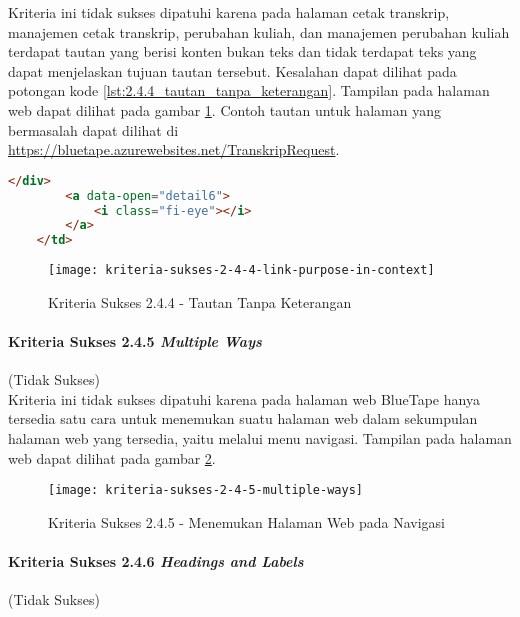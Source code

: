 Kriteria ini tidak sukses dipatuhi karena pada halaman cetak transkrip, manajemen cetak transkrip, perubahan kuliah, dan manajemen perubahan kuliah terdapat tautan yang berisi konten bukan teks dan tidak terdapat teks yang dapat menjelaskan tujuan tautan tersebut. Kesalahan dapat dilihat pada potongan kode \ref{lst:2.4.4_tautan_tanpa_keterangan}. Tampilan pada halaman web dapat dilihat pada gambar \ref{fig:2.4.4_link_purpose_in_context}. Contoh tautan untuk halaman yang bermasalah dapat dilihat di \url{https://bluetape.azurewebsites.net/TranskripRequest}.

\begin{lstlisting}[frame=single, label={lst:2.4.4_tautan_tanpa_keterangan}, language=HTML, caption=Kriteria Sukses 2.4.4 - Tautan Tanpa Keterangan]
        </div>
        <a data-open="detail6">
            <i class="fi-eye"></i>
        </a>
    </td>
\end{lstlisting}

\begin{figure}[H]
    \centering  
    \texttt{[image: kriteria-sukses-2-4-4-link-purpose-in-context]}  
    \caption[Kriteria Sukses 2.4.4 - Tautan Tanpa Keterangan]{Kriteria Sukses 2.4.4 - Tautan Tanpa Keterangan}
    \label{fig:2.4.4_link_purpose_in_context}  
\end{figure} 

\paragraph{Kriteria Sukses 2.4.5 \textit{Multiple Ways}}
\label{par:kepatuhan_bluetape_kriteria_sukses_2.4.5}
(Tidak Sukses)\\

Kriteria ini tidak sukses dipatuhi karena pada halaman web BlueTape hanya tersedia satu cara untuk menemukan suatu halaman web dalam sekumpulan halaman web yang tersedia, yaitu melalui menu navigasi. Tampilan pada halaman web dapat dilihat pada gambar \ref{fig:2.4.5_multiple_ways}.

\begin{figure}[H]
    \centering  
    \texttt{[image: kriteria-sukses-2-4-5-multiple-ways]}  
    \caption[Kriteria Sukses 2.4.5 - Menemukan Halaman Web pada Navigasi]{Kriteria Sukses 2.4.5 - Menemukan Halaman Web pada Navigasi}
    \label{fig:2.4.5_multiple_ways}  
\end{figure}

\paragraph{Kriteria Sukses 2.4.6 \textit{Headings and Labels}}
\label{par:kepatuhan_bluetape_kriteria_sukses_2.4.6}
(Tidak Sukses)\\

